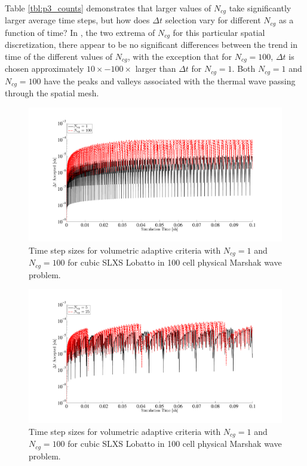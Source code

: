 Table \ref{tbl:p3_counts} demonstrates that larger values of $N_{cg}$ take significantly larger average time steps, but how does $\Delta t$ selection vary for different $N_{cg}$ as a function of time?
In , the two extrema of $N_{cg}$ for this particular spatial discretization, there appear to be no significant differences between the trend in time of the different values of $N_{cg}$, with the exception that for $N_{cg}=100$, $\Delta t$ is chosen approximately $10\times-100\times$ larger than $\Delta t$ for $N_{cg}=1$.  
Both $N_{cg}=1$ and $N_{cg}=100$ have the peaks and valleys associated with the thermal wave passing through the spatial mesh.
\begin{figure}[!htp]
\centering
\includegraphics[width=16cm,trim=2in  0.4in 0.5in 0.75in,clip=true]{chapter6_grey_radtran/Dissertation_Data/Volumetric_Trace_1cg_vs_100cg_vs_time.pdf}
\caption{Time step sizes for volumetric adaptive criteria with $N_{cg}=1$ and $N_{cg}=100$ for cubic SLXS Lobatto in 100 cell physical Marshak wave problem.}
\label{fig:1c_vs_100c}
\end{figure}
%
%
%
\begin{figure}[!htp]
\centering
\includegraphics[width=16cm,trim=2in  0.4in 0.5in 0.75in,clip=true]{chapter6_grey_radtran/Dissertation_Data/Volumetric_Trace_5cg_vs_25cg_vs_time.pdf}
\caption{Time step sizes for volumetric adaptive criteria with $N_{cg}=1$ and $N_{cg}=100$ for cubic SLXS Lobatto in 100 cell physical Marshak wave problem. }
\label{fig:5c_vs_25c}
\end{figure}

